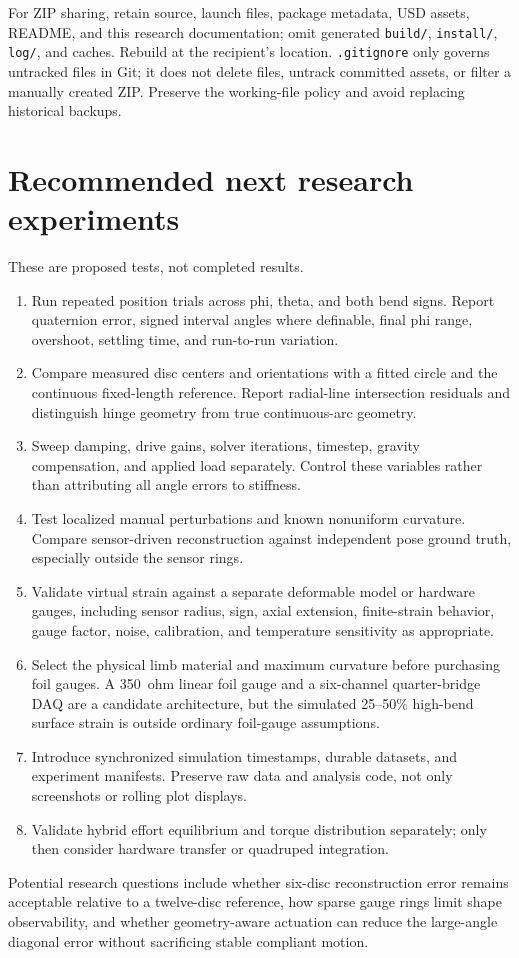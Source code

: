 \documentclass[11pt,letterpaper]{article}
\begin{document}
For ZIP sharing, retain source, launch files, package metadata, USD assets,
README, and this research documentation; omit generated \texttt{build/},
\texttt{install/}, \texttt{log/}, and caches. Rebuild at the recipient's location.
\texttt{.gitignore} only governs untracked files in Git; it does not delete
files, untrack committed assets, or filter a manually created ZIP. Preserve
the working-file policy and avoid replacing historical backups.

\section{Recommended next research experiments}
These are proposed tests, not completed results.
\begin{enumerate}
\item Run repeated position trials across phi, theta, and both bend signs.
Report quaternion error, signed interval angles where definable, final phi
range, overshoot, settling time, and run-to-run variation.
\item Compare measured disc centers and orientations with a fitted circle
and the continuous fixed-length reference. Report radial-line intersection
residuals and distinguish hinge geometry from true continuous-arc geometry.
\item Sweep damping, drive gains, solver iterations, timestep, gravity
compensation, and applied load separately. Control these variables rather
than attributing all angle errors to stiffness.
\item Test localized manual perturbations and known nonuniform curvature.
Compare sensor-driven reconstruction against independent pose ground truth,
especially outside the sensor rings.
\item Validate virtual strain against a separate deformable model or hardware
gauges, including sensor radius, sign, axial extension, finite-strain behavior,
gauge factor, noise, calibration, and temperature sensitivity as appropriate.
\item Select the physical limb material and maximum curvature before purchasing
foil gauges. A 350~ohm linear foil gauge and a six-channel quarter-bridge DAQ
are a candidate architecture, but the simulated 25--50\% high-bend surface
strain is outside ordinary foil-gauge assumptions.
\item Introduce synchronized simulation timestamps, durable datasets, and
experiment manifests. Preserve raw data and analysis code, not only screenshots
or rolling plot displays.
\item Validate hybrid effort equilibrium and torque distribution separately;
only then consider hardware transfer or quadruped integration.
\end{enumerate}
Potential research questions include whether six-disc reconstruction error
remains acceptable relative to a twelve-disc reference, how sparse gauge rings
limit shape observability, and whether geometry-aware actuation can reduce the
large-angle diagonal error without sacrificing stable compliant motion.
\end{document}
